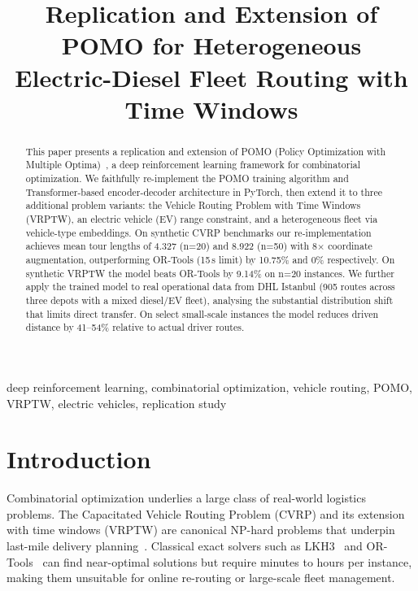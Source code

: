 \documentclass[conference]{IEEEtran}
\begin{document}
\title{Replication and Extension of POMO for Heterogeneous\\
Electric-Diesel Fleet Routing with Time Windows}

\author{
}

\maketitle

\begin{abstract}
This paper presents a replication and extension of POMO (Policy Optimization
with Multiple Optima)~\cite{kwon2020pomo}, a deep reinforcement learning
framework for combinatorial optimization. We faithfully re-implement the
POMO training algorithm and Transformer-based encoder-decoder architecture
in PyTorch, then extend it to three additional problem variants: the Vehicle
Routing Problem with Time Windows (VRPTW), an electric vehicle (EV) range
constraint, and a heterogeneous fleet via vehicle-type embeddings. On
synthetic CVRP benchmarks our re-implementation achieves mean tour lengths
of 4.327 (n=20) and 8.922 (n=50) with 8$\times$ coordinate augmentation,
outperforming OR-Tools (15\,s limit) by 10.75\% and 0\% respectively.
On synthetic VRPTW the model beats OR-Tools by 9.14\% on n=20 instances.
We further apply the trained model to real operational data from DHL Istanbul
(905 routes across three depots with a mixed diesel/EV fleet), analysing the
substantial distribution shift that limits direct transfer. On select
small-scale instances the model reduces driven distance by 41--54\% relative
to actual driver routes.
\end{abstract}

\begin{IEEEkeywords}
deep reinforcement learning, combinatorial optimization, vehicle routing,
POMO, VRPTW, electric vehicles, replication study
\end{IEEEkeywords}

\section{Introduction}

Combinatorial optimization underlies a large class of real-world logistics
problems. The Capacitated Vehicle Routing Problem (CVRP) and its extension
with time windows (VRPTW) are canonical NP-hard problems that underpin
last-mile delivery planning~\cite{dantzig1959truck}. Classical exact solvers
such as LKH3~\cite{helsgott2017lkh3} and OR-Tools~\cite{ortools} can find
near-optimal solutions but require minutes to hours per instance, making
them unsuitable for online re-routing or large-scale fleet management.
\end{document}

